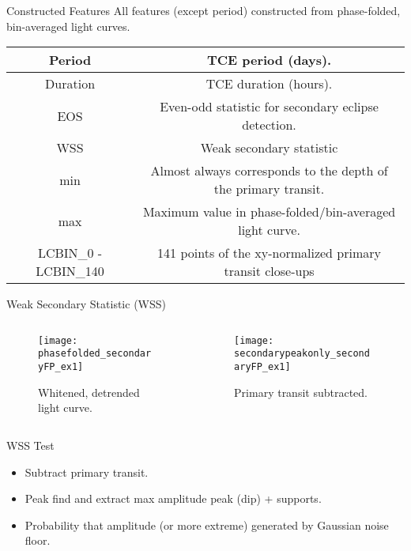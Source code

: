 \documentclass{beamer}
\begin{document}
\begin{frame}{Constructed Features}
All features (except period) constructed from phase-folded, bin-averaged light curves. 
\vfill
\begin{adjustbox}{max totalsize={.9\textwidth}{.7\textheight},center}
	
		\begin{tabular}{|c|c|}
			\hline
			Period &  TCE period (days). \\
			\hline
			Duration & TCE duration (hours). \\
			\hline
			EOS & Even-odd statistic for secondary eclipse detection. \\
			\hline
			WSS & Weak secondary statistic  \\
			\hline
			min & Almost always corresponds to the depth of the primary transit.  \\
			\hline
			max & Maximum value in phase-folded/bin-averaged light curve. \\
			\hline
			LCBIN\_0 - LCBIN\_140 & 141 points of the xy-normalized primary transit close-ups  \\
			\hline
		\end{tabular}



\end{adjustbox}


\end{frame}

\begin{frame}{Weak Secondary Statistic (WSS)}
	\begin{columns}
		\begin{column}{0.5\textwidth}
		\begin{figure}
		\texttt{[image: phasefolded\_secondaryFP\_ex1]}
		\caption{Whitened, detrended light curve.}
	\end{figure}
	\end{column}
	\begin{column}{0.5\textwidth}
		\begin{figure}
	\texttt{[image: secondarypeakonly\_secondaryFP\_ex1]}
	\caption{Primary transit subtracted.}
\end{figure}
\end{column}
\end{columns}
\begin{block}{WSS Test}
	\begin{itemize}
		\item Subtract primary transit.
		\item Peak find and extract max amplitude peak (dip) + supports.
		\item Probability that amplitude (or more extreme) generated by Gaussian noise floor. 
	\end{itemize}
\end{block}
\end{frame}
\end{document}
